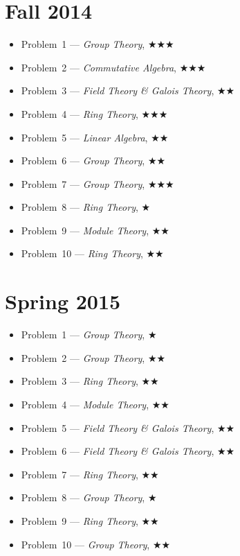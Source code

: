 \documentclass[11pt,letterpaper]{book}
\begin{document}
\section*{Fall 2014}
\begin{itemize}
\item Problem~1 --- \textit{Group Theory}, $\bigstar\bigstar\bigstar$
\item Problem~2 --- \textit{Commutative Algebra}, $\bigstar\bigstar\bigstar$
\item Problem~3 --- \textit{Field Theory \& Galois Theory}, $\bigstar\bigstar$
\item Problem~4 --- \textit{Ring Theory}, $\bigstar\bigstar\bigstar$
\item Problem~5 --- \textit{Linear Algebra}, $\bigstar\bigstar$
\item Problem~6 --- \textit{Group Theory}, $\bigstar\bigstar$
\item Problem~7 --- \textit{Group Theory}, $\bigstar\bigstar\bigstar$
\item Problem~8 --- \textit{Ring Theory}, $\bigstar$
\item Problem~9 --- \textit{Module Theory}, $\bigstar\bigstar$
\item Problem~10 --- \textit{Ring Theory}, $\bigstar\bigstar$
\end{itemize}

\section*{Spring 2015}
\begin{itemize}
\item Problem~1 --- \textit{Group Theory}, $\bigstar$
\item Problem~2 --- \textit{Group Theory}, $\bigstar\bigstar$
\item Problem~3 --- \textit{Ring Theory}, $\bigstar\bigstar$
\item Problem~4 --- \textit{Module Theory}, $\bigstar\bigstar$
\item Problem~5 --- \textit{Field Theory \& Galois Theory}, $\bigstar\bigstar$
\item Problem~6 --- \textit{Field Theory \& Galois Theory}, $\bigstar\bigstar$
\item Problem~7 --- \textit{Ring Theory}, $\bigstar\bigstar$
\item Problem~8 --- \textit{Group Theory}, $\bigstar$
\item Problem~9 --- \textit{Ring Theory}, $\bigstar\bigstar$
\item Problem~10 --- \textit{Group Theory}, $\bigstar\bigstar$
\end{itemize}
\end{document}
